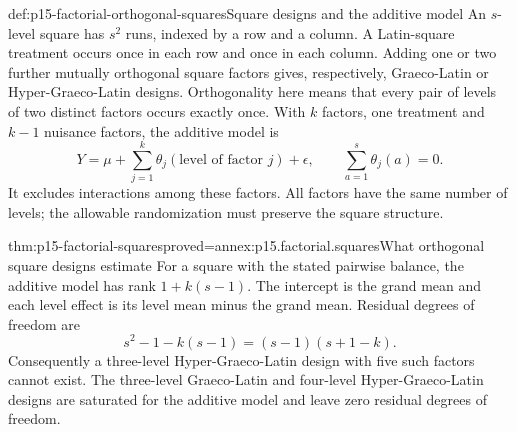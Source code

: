 \begin{hbdefinition}{def:p15-factorial-orthogonal-squares}{Square designs and the additive model}
An \(s\)-level square has \(s^2\) runs, indexed by a row and a column.
A Latin-square treatment occurs once in each row and once in each column.
Adding one or two further mutually orthogonal square factors gives,
respectively, Graeco-Latin or Hyper-Graeco-Latin designs. Orthogonality here
means that every pair of levels of two distinct factors occurs exactly once.
With \(k\) factors, one treatment and \(k-1\) nuisance factors, the
additive model is
\[
 Y=\mu+\sum_{j=1}^{k}\theta_j(\text{level of factor }j)+\epsilon,
 \qquad \sum_{a=1}^{s}\theta_j(a)=0.
\]
It excludes interactions among these factors. All factors have the same
number of levels; the allowable randomization must preserve the square
structure.
\end{hbdefinition}

\begin{hbtheorem}{thm:p15-factorial-squares}{proved=annex:p15.factorial.squares}{What orthogonal square designs estimate}
For a square with the stated pairwise balance, the additive model has rank
\(1+k(s-1)\). The intercept is the grand mean and each level effect is
its level mean minus the grand mean. Residual degrees of freedom are
\[
 s^2-1-k(s-1)=(s-1)(s+1-k).
\]
Consequently a three-level Hyper-Graeco-Latin design with five such factors
cannot exist. The three-level Graeco-Latin and four-level Hyper-Graeco-Latin
designs are saturated for the additive model and leave zero residual degrees
of freedom.
\end{hbtheorem}

